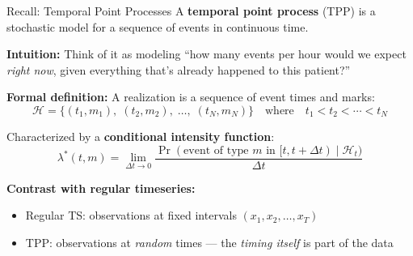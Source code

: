 \documentclass[aspectratio=169,10pt]{beamer}
\begin{document}
\begin{frame}{Recall: Temporal Point Processes}
A \textbf{temporal point process} (TPP) is a stochastic model for a sequence of events in continuous time.

\vspace{0.3em}
\textbf{Intuition:} Think of it as modeling ``how many events per hour would we expect \emph{right now}, given everything that's already happened to this patient?''

\vspace{0.5em}
\textbf{Formal definition:} A realization is a sequence of event times and marks:
\[
    \mathcal{H} = \{(t_1, m_1),\; (t_2, m_2),\; \ldots,\; (t_N, m_N)\}
    \quad\text{where}\quad t_1 < t_2 < \cdots < t_N
\]

\vspace{0.3em}
Characterized by a \textbf{conditional intensity function}:
\[
    \lambda^*(t, m) = \lim_{\Delta t \to 0}
    \frac{\Pr(\text{event of type } m \text{ in } [t, t+\Delta t) \mid \mathcal{H}_t)}{\Delta t}
\]

\vspace{0.5em}
\textbf{Contrast with regular timeseries:}
\begin{itemize}
    \item Regular TS: observations at fixed intervals $(x_1, x_2, \ldots, x_T)$
    \item TPP: observations at \emph{random} times --- the \emph{timing itself} is part of the data
\end{itemize}
\end{frame}
\end{document}
